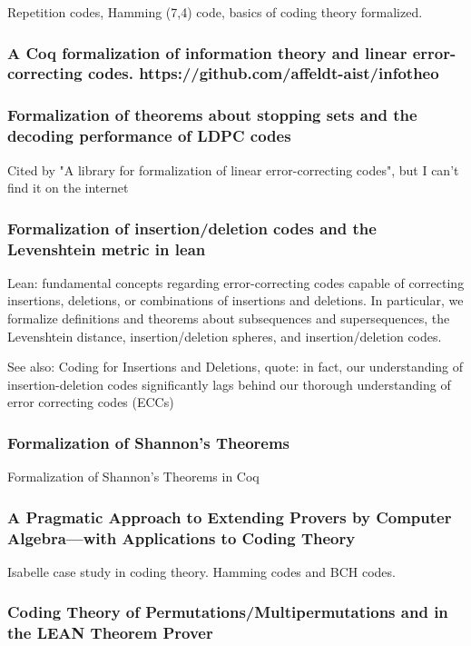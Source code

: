 \documentclass{article}
\begin{document}
Repetition codes, Hamming (7,4) code, basics of coding theory formalized.

\subsubsection{A Coq formalization of information theory and linear error-correcting codes. https://github.com/affeldt-aist/infotheo}
\subsubsection{Formalization of theorems about stopping sets and the decoding performance of LDPC codes}

Cited by "A library for formalization of linear error-correcting codes", but I can't find it on the internet

\subsubsection{Formalization of insertion/deletion codes and the Levenshtein metric in lean}

Lean: fundamental concepts regarding error-correcting codes capable of correcting insertions, deletions, or combinations of insertions and deletions. In particular, we formalize definitions and theorems about subsequences and supersequences, the Levenshtein distance, insertion/deletion spheres, and insertion/deletion codes.

See also: Coding for Insertions and Deletions, quote: in fact, our understanding of insertion-deletion codes significantly lags behind our thorough understanding of error correcting codes (ECCs)


\subsubsection{Formalization of Shannon’s Theorems}

Formalization of Shannon's Theorems in Coq

\subsubsection{A Pragmatic Approach to Extending Provers by Computer Algebra—with Applications to Coding Theory}

Isabelle case study in coding theory. Hamming codes and BCH codes.

\subsubsection{Coding Theory of Permutations/Multipermutations and in the LEAN Theorem Prover}
\end{document}
